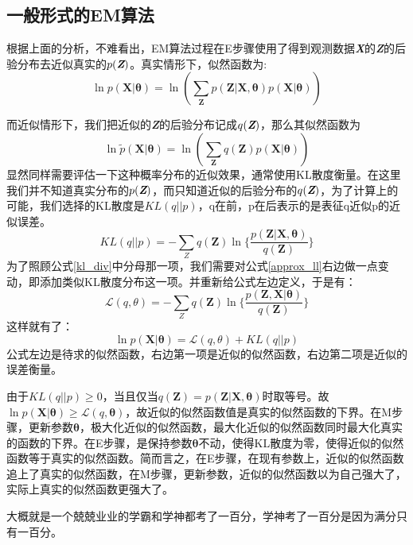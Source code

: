 \documentclass{article}
\begin{document}
\begin{CJK*}{UTF8}{gbsn}
\section{一般形式的EM算法}
根据上面的分析，不难看出，EM算法过程在E步骤使用了得到观测数据\textit{\textbf{X}}的\textit{\textbf{Z}}的后验分布去近似真实的$p(\textit{\textbf{Z}})$。真实情形下，似然函数为:
\begin{equation} \label{em_ll}
    \ln p(\boldsymbol{X}|\boldsymbol{\theta}) = \ln(\sum_{\boldsymbol{Z}}^{}p(\boldsymbol{Z}|\boldsymbol{X},\boldsymbol{\theta})
    p(\boldsymbol{X}|\boldsymbol{\theta})) 
\end{equation}
\par
而近似情形下，我们把近似的\textit{\textbf{Z}}的后验分布记成$q(\textit{\textbf{Z}})$，那么其似然函数为
\begin{equation} \label{approx_ll}
    \ln \widetilde p(\boldsymbol{X}|\boldsymbol{\theta}) = \ln(\sum_{\boldsymbol{Z}}^{}q(\boldsymbol{Z})
    p(\boldsymbol{X}|\boldsymbol{\theta})) 
\end{equation}
显然同样需要评估一下这种概率分布的近似效果，通常使用KL散度衡量。在这里我们并不知道真实分布的$p(\textit{\textbf{Z}})$，而只知道近似的后验分布的$q(\textit{\textbf{Z}})$，为了计算上的可能，我们选择的KL散度是$KL(q||p)$，q在前，p在后表示的是表征q近似p的近似误差。
\begin{equation} \label{kl_div}
    KL(q||p)=-\sum_{Z}{}q(\boldsymbol{Z}) \ln \{\frac{p(\boldsymbol{Z}|\boldsymbol{X},\boldsymbol{\theta})}{q(\boldsymbol{Z})}\}
\end{equation}
为了照顾公式\ref{kl_div}中分母那一项，我们需要对公式\ref{approx_ll}右边做一点变动，即添加类似KL散度分布这一项。并重新给公式左边定义，于是有：
\begin{equation} 
    \mathcal{L}(q,\theta)=-\sum_{Z}{}q(\boldsymbol{Z}) \ln \{ \frac{p(\boldsymbol{Z},\boldsymbol{X}|\boldsymbol{\theta})}{q(\boldsymbol{Z})}\}
\end{equation}
这样就有了：
\begin{equation} 
    \ln p(\boldsymbol{X}|\boldsymbol{\theta}) = \mathcal{L}(q,\theta) +  KL(q||p)
\end{equation}
公式左边是待求的似然函数，右边第一项是近似的似然函数，右边第二项是近似的误差衡量。\par
由于$KL(q||p)\geq 0$，当且仅当$q(\boldsymbol{Z})=p(\boldsymbol{Z}|\boldsymbol{X},\boldsymbol{\theta})$时取等号。故$\ln p(\boldsymbol{X}|\boldsymbol{\theta}) \geq \mathcal{L}(q,\boldsymbol{\theta})$，故近似的似然函数值是真实的似然函数的下界。在M步骤，更新参数$\boldsymbol{\theta}$，极大化近似的似然函数，最大化近似的似然函数同时最大化真实的函数的下界。在E步骤，是保持参数$\boldsymbol{\theta}$不动，使得KL散度为零，使得近似的似然函数等于真实的似然函数。简而言之，在E步骤，在现有参数上，近似的似然函数追上了真实的似然函数，在M步骤，更新参数，近似的似然函数以为自己强大了，实际上真实的似然函数更强大了。\par
大概就是一个兢兢业业的学霸和学神都考了一百分，学神考了一百分是因为满分只有一百分。

\end{CJK*}
\end{document}
